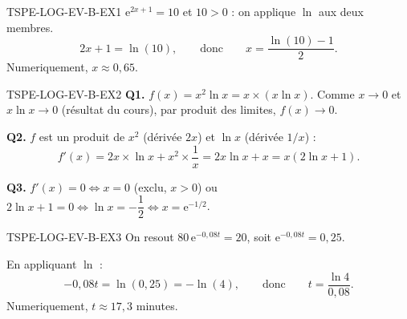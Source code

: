 \begin{corrige}{TSPE-LOG-EV-B-EX1}
$\mathrm{e}^{2x+1}=10$ et $10>0$ : on applique $\ln$ aux deux membres.
\[
  2x+1 = \ln(10), \qquad \text{donc} \qquad x = \frac{\ln(10)-1}{2}.
\]
Numeriquement, $x \approx 0{,}65$.
\end{corrige}

\begin{corrige}{TSPE-LOG-EV-B-EX2}
\textbf{Q1.} $f(x) = x^2\ln x = x \times (x\ln x)$. Comme $x \to 0$ et $x\ln x \to 0$ (résultat du cours), par produit des limites, $f(x) \to 0$.

\textbf{Q2.} $f$ est un produit de $x^2$ (dérivée $2x$) et $\ln x$ (dérivée $1/x$) :
\[
  f'(x) = 2x \times \ln x + x^2 \times \frac{1}{x} = 2x\ln x + x = x(2\ln x + 1).
\]

\textbf{Q3.} $f'(x)=0 \iff x=0$ (exclu, $x>0$) ou $2\ln x + 1 = 0 \iff \ln x = -\dfrac{1}{2} \iff x = \mathrm{e}^{-1/2}$.
\end{corrige}

\begin{corrige}{TSPE-LOG-EV-B-EX3}
On resout $80\,\mathrm{e}^{-0{,}08t} = 20$, soit $\mathrm{e}^{-0{,}08t} = 0{,}25$.

En appliquant $\ln$ :
\[
  -0{,}08t = \ln(0{,}25) = -\ln(4), \qquad \text{donc} \qquad t = \frac{\ln 4}{0{,}08}.
\]
Numeriquement, $t \approx 17{,}3$ minutes.
\end{corrige}
